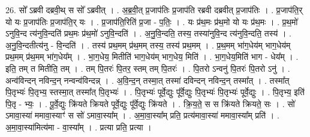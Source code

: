\documentclass[17pt]{extarticle}
\begin{document}
26. सो᳚ ऽब्रवी दब्रवी॒थ् स सो᳚ ऽब्रवीत् । . अ॒ब्र॒वी॒त् प्र॒जाप॑तिः प्र॒जाप॑ति रब्रवी दब्रवीत् प्र॒जाप॑तिः । . प्र॒जाप॑ति॒र् यो यः प्र॒जाप॑तिः प्र॒जाप॑ति॒र् यः । . प्र॒जाप॑ति॒रिति॑ प्र॒जा - प॒तिः॒ । . यः प्र॑थ॒मः प्र॑थ॒मो यो यः प्र॑थ॒मः । . प्र॒थ॒मो॑ ऽनुवि॒न्द त्य॑नुवि॒न्दति॑ प्रथ॒मः प्र॑थ॒मो॑ ऽनुवि॒न्दति॑ । . अ॒नु॒वि॒न्दति॒ तस्य॒ तस्या॑नुवि॒न्द त्य॑नुवि॒न्दति॒ तस्य॑ । . अ॒नु॒वि॒न्दतीत्य॑नु - वि॒न्दति॑ । . तस्य॑ प्रथ॒मम् प्र॑थ॒मम् तस्य॒ तस्य॑ प्रथ॒मम् । . प्र॒थ॒मम् भा॑ग॒धेय॑म् भाग॒धेय॑म् प्रथ॒मम् प्र॑थ॒मम् भा॑ग॒धेय᳚म् । . भा॒ग॒धेय॒ मितीति॑ भाग॒धेय॑म् भाग॒धेय॒ मिति॑ । . भा॒ग॒धेय॒मिति॑ भाग - धेय᳚म् । . इति॒ तम् त मितीति॒ तम् । . तम् पि॒तरः॑ पि॒तर॒ स्तम् तम् पि॒तरः॑ । . पि॒तरो ऽन्वनु॑ पि॒तरः॑ पि॒तरो ऽनु॑ । . अन्व॑विन्दन् नविन्द॒न् नन्वन्व॑विन्दन्न् । . अ॒वि॒न्द॒न् तस्मा॒त् तस्मा॑ दविन्दन् नविन्द॒न् तस्मा᳚त् । . तस्मा᳚त् पि॒तृभ्यः॑ पि॒तृभ्य॒ स्तस्मा॒त् तस्मा᳚त् पि॒तृभ्यः॑ । . पि॒तृभ्यः॑ पूर्वे॒द्युः पू᳚र्वे॒द्युः पि॒तृभ्यः॑ पि॒तृभ्यः॑ पूर्वे॒द्युः । . पि॒तृभ्य॒ इति॑ पि॒तृ - भ्यः॒ । . पू॒र्वे॒द्युः क्रि॑यते क्रियते पूर्वे॒द्युः पू᳚र्वे॒द्युः क्रि॑यते । . क्रि॒य॒ते॒ स स क्रि॑यते क्रियते॒ सः । . सो॑ ऽमावा॒स्या॑ ममावा॒स्याꣳ॑ स सो॑ ऽमावा॒स्या᳚म् । . अ॒मा॒वा॒स्या᳚म् प्रति॒ प्रत्य॑मावा॒स्या॑ ममावा॒स्या᳚म् प्रति॑ । . अ॒मा॒वा॒स्या॑मित्य॑मा - वा॒स्या᳚म् । . प्रत्या प्रति॒ प्रत्या । \newline
\end{document}
